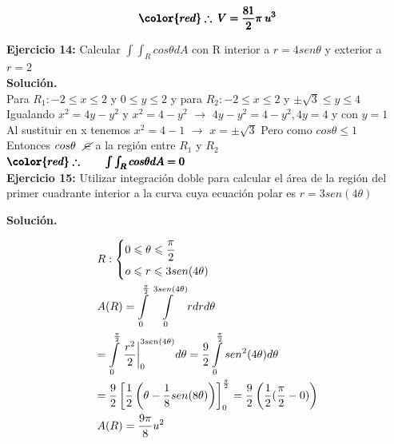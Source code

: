\documentclass[12pt]{article}
\begin{document}
\begin{align*}
	\pmb{\color{red} \therefore\: V = \frac{81}{2}\pi\: u^3}
\end{align*}

\textbf{Ejercicio 14:} Calcular $\int\int_{R}cos\theta dA$ con R interior a $r=4sen\theta$ y exterior a $r=2$
\\[10pt]
\textbf{Solución.}
\\[10pt]
Para $R_{1}: -2\leq x \leq2$ y $0\leq y \leq2$ y para $R_{2}:-2\leq x \leq2$ y $\pm\sqrt{3}\leq y \leq4$
\\[8pt]
Igualando $x^2=4y-y^2$ y $x^2=4-y^2$ $\rightarrow$ $4y-y^2=4-y^2, 4y=4$ y con $y=1$ 
\\[8pt]
Al sustituir en x tenemos $x^2=4-1$ $\rightarrow$ $x=\pm\sqrt{3}$\hspace{0.25cm} Pero como $cos\theta\leq1$ 
\\[8pt] Entonces $cos\theta \hspace{0.25cm} \cancel{\in}$ a la región entre $R_{1}$ y $R_{2}$
\\[9pt]
$\pmb{\color{red} \therefore \qquad \int\int_{R}cos\theta dA=0}$ 
\\[15pt]

\noindent \textbf{Ejercicio 15:} Utilizar integración doble para calcular el área de la región del primer cuadrante interior a la curva cuya ecuación polar es $r=3sen(4\theta )$

\vspace{5mm}
\noindent \textbf{Solución.}
\vspace{5mm}

\[\begin{gathered}
  R:\left\{ \begin{gathered}
  0 \leqslant \theta  \leqslant \frac{\pi }{2} \hfill \\
  o \leqslant r \leqslant 3sen(4\theta ) \hfill \\ 
\end{gathered}  \right. \hfill \\
  A(R) = \int\limits_0^{\frac{\pi }{2}} {\int\limits_0^{3sen(4\theta )} {rdrd\theta } }  \hfill \\
   = \int\limits_0^{\frac{\pi }{2}} {\left. {\frac{{{r^2}}}{2}} \right|_0^{3sen(4\theta )}} d\theta  = \frac{9}{2}\int\limits_0^{\frac{\pi }{2}} {se{n^2}(4\theta )d\theta }  \hfill \\
   = \frac{9}{2}\left[ {\frac{1}{2}\left( {\theta  - \frac{1}{8}sen(8\theta )} \right)} \right]_0^{\frac{\pi }{2}} = \frac{9}{2}\left( {\frac{1}{2}(\frac{\pi }{2} - 0)} \right) \hfill \\
  A(R) = \frac{{9\pi }}{8}{u^2} \hfill \\ 
\end{gathered} \]
\end{document}
